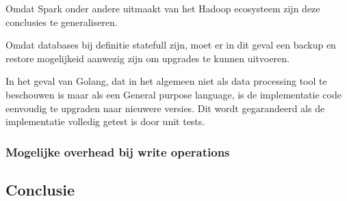 Omdat Spark onder andere uitmaakt van het Hadoop ecosysteem zijn deze conclusies te generaliseren.

Omdat databases bij definitie statefull zijn, moet er in dit geval een backup en restore mogelijkeid aanwezig zijn om upgrades te kunnen uitvoeren.

In het geval van Golang, dat in het algemeen niet als data processing tool te beschouwen is maar als een General purpose language, is de implementatie code eenvoudig te upgraden naar nieuwere versies. Dit wordt gegarandeerd als de implementatie volledig getest is door unit tests. 

\subsubsection{\textbf{Mogelijke overhead bij write operations}}







    
\subsection{Conclusie}

